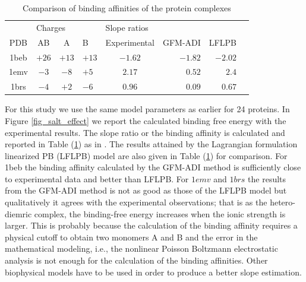 \begin{table}[!t]
\begin{center}
\begin{tabular}{ccclcrrr}
\hline
\multicolumn{1}{c}{}           & \multicolumn{3}{l}{Charges} & \multicolumn{3}{l}{Slope ratios} \\
 PDB  & AB    & A     & B      & Experimental & GFM-ADI & LFLPB   \\ \hline
 1beb & $+26$ & $+13$ & $+13$  & $-1.62$      & $-1.82$ & $-2.02$ \\ %
 1emv & $-3$  & $-8$  & $+5$   & $2.17$       & $0.52$  & $2.4$   \\
 1brs & $-4$  & $+2$  & $-6$   & $0.96$		  &	$0.09$ & $0.67$ 	  \\
	 \hline
\end{tabular}
\caption{Comparison of binding affinities of the protein complexes}
\label{tab_salt_effect}
\end{center}
\end{table}

 
For this study we use the same model parameters as earlier for 24 proteins. In Figure \ref{fig_salt_effect} we report the calculated binding free energy with the experimental results. The slope ratio or the binding affinity is calculated and reported in Table (\ref{tab_salt_effect}) as in \cite{Zhao2011}. The results attained by the Lagrangian formulation linearized PB (LFLPB) model \cite{Zhan2011} are also given in Table (\ref{tab_salt_effect}) for comparison. For 1beb the binding affinity calculated by the GFM-ADI method is sufficiently close to experimental data and better than LFLPB. For $1emv$ and $1brs$ the results from the GFM-ADI method is not as good as those of the LFLPB model but qualitatively it agrees with the experimental observations; that is as the hetero-diemric complex, the binding-free energy increases when the ionic strength is larger. This is probably because the calculation of the binding affinity requires a physical cutoff to obtain two monomers A and B and the error in the mathematical modeling, i.e., the nonlinear Poisson Boltzmann electrostatic analysis is not enough for the calculation of the binding affinities. Other biophysical models have to be used in order to produce a better slope estimation. 
   	



